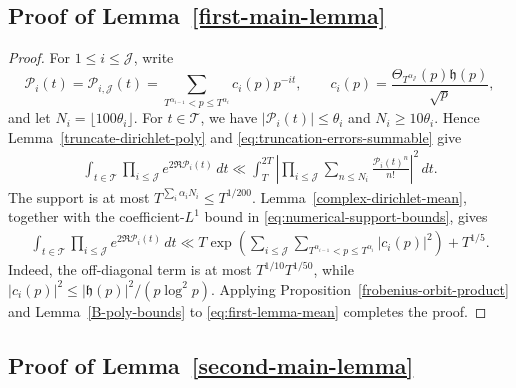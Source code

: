 \documentclass[twoside,reqno,11pt,a4paper]{amsart}
\numberwithin{equation}{section}
\theoremstyle{plain}
\theoremstyle{definition}
\theoremstyle{remark}
\renewcommand{\le}{\leqslant}
\renewcommand{\ge}{\geqslant}
\begin{document}
\subsection{Proof of Lemma~\ref{first-main-lemma}}

\begin{proof}
For $1\le i\le\mathcal J$, write
\begin{equation*}
 \mathcal P_i(t)=\mathcal P_{i,\mathcal J}(t)
 =\sum_{T^{\alpha_{i-1}}<p\le T^{\alpha_i}}c_i(p)p^{-it},
 \qquad c_i(p)=\frac{\Theta_{T^{\alpha_{\mathcal J}}}(p)\mathfrak h(p)}{\sqrt p},
\end{equation*}
and let $N_i=\lfloor100\theta_i\rfloor$. For $t\in \mathcal T$, we have
$|\mathcal P_i(t)|\le\theta_i$ and $N_i\ge10\theta_i$.  Hence
Lemma~\ref{truncate-dirichlet-poly} and \eqref{eq:truncation-errors-summable}
give
\begin{align}\label{eq:first-lemma-truncation}
 \int_{t\in \mathcal T}\prod_{i\le\mathcal J}e^{2\Re\mathcal P_i(t)}\,dt
 \ll\int_T^{2T}\left|\prod_{i\le\mathcal J}
 \sum_{n\le N_i}\frac{\mathcal P_i(t)^n}{n!}\right|^2\,dt.
\end{align}
The support is at most $T^{\sum_i\alpha_iN_i}\le T^{1/200}$.
Lemma~\ref{complex-dirichlet-mean}, together with the coefficient-$L^1$ bound in \eqref{eq:numerical-support-bounds}, gives
\begin{align}\label{eq:first-lemma-mean}
 \int_{t\in \mathcal T}\prod_{i\le\mathcal J}e^{2\Re\mathcal P_i(t)}\,dt
 \ll T\exp\left(\sum_{i\le\mathcal J}\sum_{T^{\alpha_{i-1}}<p\le T^{\alpha_i}}
 |c_i(p)|^2\right)+T^{1/5}.
\end{align}
Indeed, the off-diagonal term is at most $T^{1/10}T^{1/50}$, while
$|c_i(p)|^2\le|\mathfrak h(p)|^2/(p\log^2p)$.  Applying Proposition~\ref{frobenius-orbit-product} and Lemma~\ref{B-poly-bounds} to \eqref{eq:first-lemma-mean} completes the proof.
\end{proof}



\subsection{Proof of Lemma~\ref{second-main-lemma}}
\end{document}
